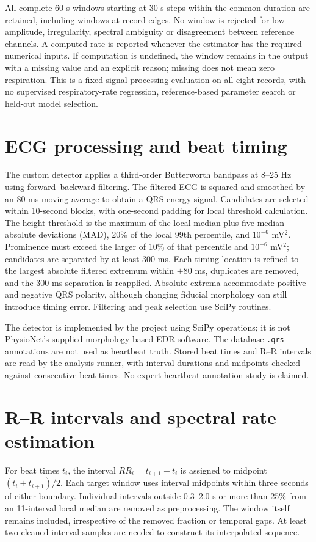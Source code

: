 All complete 60 s windows starting at 30 s steps within the common duration are retained, including windows at record edges. No window is rejected for low amplitude, irregularity, spectral ambiguity or disagreement between reference channels. A computed rate is reported whenever the estimator has the required numerical inputs. If computation is undefined, the window remains in the output with a missing value and an explicit reason; missing does not mean zero respiration. This is a fixed signal-processing evaluation on all eight records, with no supervised respiratory-rate regression, reference-based parameter search or held-out model selection.

\section{ECG processing and beat timing}
The custom detector applies a third-order Butterworth bandpass at 8--25 Hz using forward--backward filtering. The filtered ECG is squared and smoothed by an 80 ms moving average to obtain a QRS energy signal. Candidates are selected within 10-second blocks, with one-second padding for local threshold calculation. The height threshold is the maximum of the local median plus five median absolute deviations (MAD), 20\% of the local 99th percentile, and $10^{-6}$ mV$^2$. Prominence must exceed the larger of 10\% of that percentile and $10^{-6}$ mV$^2$; candidates are separated by at least 300 ms. Each timing location is refined to the largest absolute filtered extremum within $\pm80$ ms, duplicates are removed, and the 300 ms separation is reapplied. Absolute extrema accommodate positive and negative QRS polarity, although changing fiducial morphology can still introduce timing error. Filtering and peak selection use SciPy routines.

The detector is implemented by the project using SciPy operations; it is not PhysioNet's supplied morphology-based EDR software. The database \texttt{.qrs} annotations are not used as heartbeat truth. Stored beat times and R--R intervals are read by the analysis runner, with interval durations and midpoints checked against consecutive beat times. No expert heartbeat annotation study is claimed.

\section{R--R intervals and spectral rate estimation}
For beat times $t_i$, the interval $RR_i=t_{i+1}-t_i$ is assigned to midpoint $(t_i+t_{i+1})/2$. Each target window uses interval midpoints within three seconds of either boundary. Individual intervals outside 0.3--2.0 s or more than 25\% from an 11-interval local median are removed as preprocessing. The window itself remains included, irrespective of the removed fraction or temporal gaps. At least two cleaned interval samples are needed to construct its interpolated sequence.

